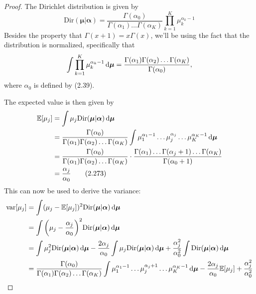 \begin{proof}
    The Dirichlet distribution is given by
    \begin{equation}\label{eq:2.38}\tag{2.38}
        \text{Dir}(\bm{\mu} | \bm{\alpha})
        = \frac{\Gamma(\alpha_0)}{\Gamma(\alpha_1)\ldots\Gamma(\alpha_K)}
        \prod_{k = 1}^K \mu_k^{\alpha_k - 1}
    \end{equation}
    Besides the property that $\Gamma(x+1) = x\Gamma(x)$, we'll be using the fact that the distribution is normalized,
    specifically that
    \[
        \int \prod_{k = 1}^K \mu_k^{\alpha_k - 1} \mathop{}\!\mathrm{d} \bm{\mu}
        = \frac{\Gamma(\alpha_1)\Gamma(\alpha_2)\ldots\Gamma(\alpha_K)}{\Gamma(\alpha_0)},
    \]
    where $\alpha_0$ is defined by (2.39).

    The expected value is then given by
    \begin{align*}
        \mathbb{E}[\mu_j] 
        &= \int \mu_j \text{Dir}(\bm{\mu} | \bm{\alpha}) \mathop{}\!\mathrm{d} \bm{\mu} \\
        &= \frac{\Gamma(\alpha_0)}{\Gamma(\alpha_1)\Gamma(\alpha_2)\ldots\Gamma(\alpha_K)}
        \int \mu_1^{\alpha_1 - 1}\dots\mu_j^{\alpha_j}\ldots\mu_K^{\alpha_K - 1} \mathop{}\!\mathrm{d} \bm{\mu} \\
        &= \frac{\Gamma(\alpha_0)}{\Gamma(\alpha_1)\Gamma(\alpha_2)\ldots\Gamma(\alpha_K)}
        \cdot \frac{\Gamma(\alpha_1)\ldots\Gamma(\alpha_j + 1)\ldots\Gamma(\alpha_K)}
        {\Gamma(\alpha_0 + 1)} \\
        &= \frac{\alpha_j}{\alpha_0} 
        \tag{2.273}
    \end{align*}
    This can now be used to derive the variance:
    \begin{align*}
        \text{var}[\mu_j] 
        &= \int (\mu_j - \mathbb{E}[\mu_j])^2 \text{Dir}(\bm{\mu} | \bm{\alpha}) \diff \bm{\mu} \\
        &= \int \bigg(\mu_j - \frac{\alpha_j}{\alpha_0}\bigg)^2 
        \text{Dir}(\bm{\mu} | \bm{\alpha}) \diff \bm{\mu} \\
        &= \int \mu_j^2 \text{Dir}(\bm{\mu} | \bm{\alpha}) \diff \bm{\mu}
        - \frac{2\alpha_j}{\alpha_0}\int \mu_j\text{Dir}(\bm{\mu} | \bm{\alpha}) \diff \bm{\mu}
        + \frac{\alpha_j^2}{\alpha_0^2} \int \text{Dir}(\bm{\mu} | \bm{\alpha}) \diff \bm{\mu} \\
        &= \frac{\Gamma(\alpha_0)}{\Gamma(\alpha_1)\Gamma(\alpha_2)\ldots\Gamma(\alpha_K)}
        \int \mu_1^{\alpha_1 - 1}\dots\mu_j^{\alpha_j + 1}\ldots\mu_K^{\alpha_K - 1} \diff \bm{\mu} 
        - \frac{2\alpha_j}{\alpha_0} \mathbb{E}[\mu_j] + \frac{\alpha_j^2}{\alpha_0^2} \\

\end{align*}
\end{proof}
